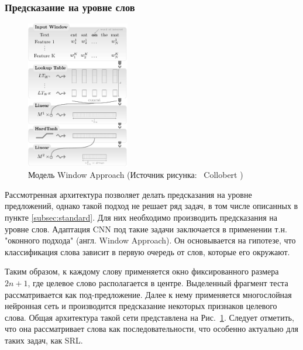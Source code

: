 \subsubsection{Предсказание на уровне слов}
\begin{figure}[t]
\centering
\includegraphics[width=0.4\textwidth]{img/network-window}
\caption{\label{fig:network-window}Модель Window Approach (Источник рисунка: \hspace{\textwidth}~Collobert \autocite{DBLP:journals/corr/abs-1103-0398})}
\end{figure}

Рассмотренная архитектура позволяет делать предсказания на уровне предложений, однако такой подход не решает ряд задач, в том числе описанных в пункте \ref{subsec:standard}. Для них необходимо производить предсказания на уровне слов. Адаптация CNN под такие задачи заключается в применении т.н. "оконного подхода" (англ. Window Approach).  Он основывается на гипотезе, что классификация слова зависит в первую очередь от слов, которые его окружают.

Таким образом, к каждому слову применяется окно фиксированного размера $2n + 1$, где целевое слово располагается в центре. Выделенный фрагмент теста рассматривается как под-предложение. Далее к нему применяется многослойная нейронная сеть и производится предсказание некоторых признаков целевого слова. Общая архитектура такой сети представлена на Рис.~\ref{fig:network-window}. Следует отметить, что она рассматривает слова как последовательности, что особенно актуально для таких задач, как SRL. 




\newpage

